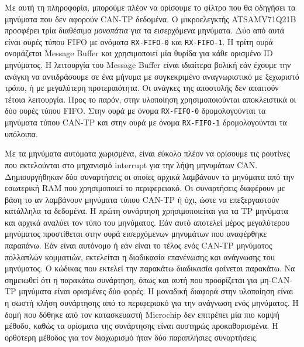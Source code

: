 \documentclass[a4paper,nobib,justified]{tufte-book}
\begin{document}
Με αυτή τη πληροφορία, μπορούμε πλέον να ορίσουμε το φίλτρο που θα οδηγήσει τα μηνύματα που δεν αφορούν CAN-TP δεδομένα. Ο μικροελεγκτής ATSAMV71Q21B προσφέρει τρία διαθέσιμα \textit{μονοπάτια} για τα εισερχόμενα μηνύματα. Δύο από αυτά είναι ουρές τύπου FIFO με ονόματα \texttt{RX-FIFO-0} και \texttt{RX-FIFO-1}. Η τρίτη ουρά ονομάζεται Message Buffer και χρησιμοποιεί μία θυρίδα για κάθε ορισμένο ID μηνύματος. Η λειτουργία του Message Buffer είναι ιδιαίτερα βολική εάν έχουμε την ανάγκη να αντιδράσουμε σε ένα μήνυμα με συγκεκριμένο αναγνωριστικό με ξεχωριστό τρόπο, ή με μεγαλύτερη προτεραιότητα. Οι ανάγκες της αποστολής δεν απαιτούν τέτοια λειτουργία. Προς το παρόν, στην υλοποίηση χρησιμοποιούνται αποκλειστικά οι δύο ουρές τύπου FIFO. Στην ουρά με όνομα \texttt{RX-FIFO-0} δρομολογούνται τα μηνύματα τύπου CAN-TP και στην ουρά με όνομα \texttt{RX-FIFO-1} δρομολογούνται τα υπόλοιπα.


Με τα μηνύματα αυτόματα χωρισμένα, είναι εύκολο πλέον να ορίσουμε τις ρουτίνες που εκτελούνται στο μηχανισμό interrupt για την λήψη μηνυμάτων CAN. Δημιουργήθηκαν δύο συναρτήσεις οι οποίες αρχικά λαμβάνουν τα μηνύματα από την εσωτερική RAM που χρησιμοποιεί το περιφερειακό. Οι συναρτήσεις διαφέρουν με βάση το αν λαμβάνουν μηνύματα τύπου CAN-TP ή όχι, ώστε να επεξεργαστούν κατάλληλα τα δεδομένα. Η πρώτη συνάρτηση χρησιμοποιείται για τα TP μηνύματα και αρχικά αναλύει τον τύπο του μηνύματος. Εάν αυτό αποτελεί μέρος μεγαλύτερου μηνύματος προστίθεται στην ουρά εισερχόμενων μηνυμάτων που αναφέρθηκε παραπάνω. Εάν είναι αυτόνομο ή εάν είναι το τέλος ενός CAN-TP μηνύματος πολλαπλών κομματιών, εκτελείται η διαδικασία επανένωσης και ανάγνωσης του μηνύματος. Ο κώδικας που εκτελεί την παρακάτω διαδικασία φαίνεται παρακάτω. Να σημειωθεί ότι η παρακάτω συνάρτηση, όπως και αυτή που προορίζεται για μη-CAN-TP μηνύματα είναι ορισμένες δύο φορές. Η μοναδική διαφορά στην υλοποίηση είναι η σωστή κλήση συνάρτησης από το περιφεριακό για την ανάγνωση ενός μηνύματος. Η δομή που δόθηκε από τον κατασκευαστή Microchip δεν επιτρέπει μία πιο κομψή μέθοδο, καθώς τα ορίσματα της συνάρτησης είναι αυστηρώς προκαθορισμένα. Η ορθότερη μέθοδος για τον διαχωρισμό ήταν δύο παραπλήσιες συναρτήσεις.
\end{document}
